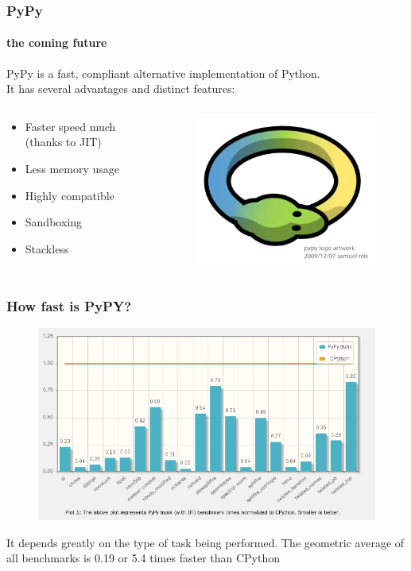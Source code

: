\documentclass[compress=true]{beamer}
\begin{document}
\begin{frame}
	\frametitle{PyPy}
	\framesubtitle{the coming future}
	PyPy is a fast, compliant alternative implementation of Python.\\
	It has several advantages and distinct features:
	\begin{columns}
		\begin{column}{0.6\textwidth}
			\begin{itemize}
				\item Faster speed much (thanks to JIT)
				\item Less memory usage 
				\item Highly compatible
				\item Sandboxing
				\item Stackless
			\end{itemize}
		\end{column}
		\begin{column}{0.4\textwidth}
			\begin{figure}
				\includegraphics[height=0.4\textheight]{pypy.png}
			\end{figure}
		\end{column}
	\end{columns}
\end{frame}
\begin{frame}
	\frametitle{How fast is PyPY?}
	\begin{figure}
		\includegraphics[height=0.65\textheight]{fast_pypy_1.png}
	\end{figure}
	\tiny{It depends greatly on the type of task being performed. The geometric
	average of all benchmarks is 0.19 or 5.4 times faster than CPython}
\end{frame}
\end{document}
